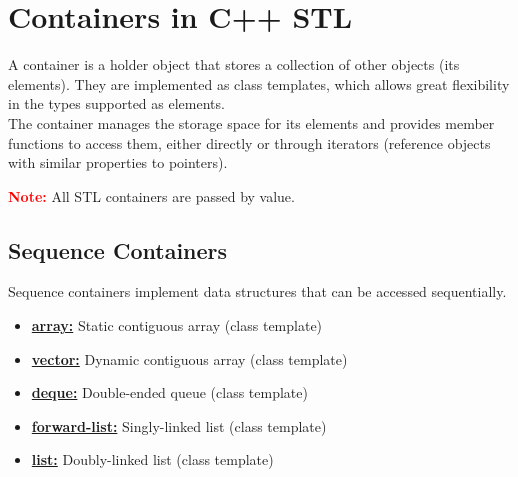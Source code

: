 \section{\textbf{Containers in C++ STL}}
A container is a holder object that stores a collection of other objects (its elements). They are implemented as class templates, which allows great flexibility in the types supported as elements.\\
The container manages the storage space for its elements and provides member functions to access them, either directly or through iterators (reference objects with similar properties to pointers).
\newpage
\begin{table}[!h]
	\begin{center}
	\caption{Containers}
	\end{center}
\end{table}

\textbf{\textcolor{red}{\large{Note:}}} All STL containers are passed by value.

\subsection{Sequence Containers}
Sequence containers implement data structures that can be accessed sequentially. 
\begin{itemize}
	\item \textbf{\underline{array:}} Static contiguous array (class template)
	\item \textbf{\underline{vector:}} Dynamic contiguous array (class template)
	\item \textbf{\underline{deque:}} Double-ended queue (class template)
	\item \textbf{\underline{forward-list:}} Singly-linked list (class template)
	\item \textbf{\underline{list:}}  Doubly-linked list (class template)
\end{itemize}


